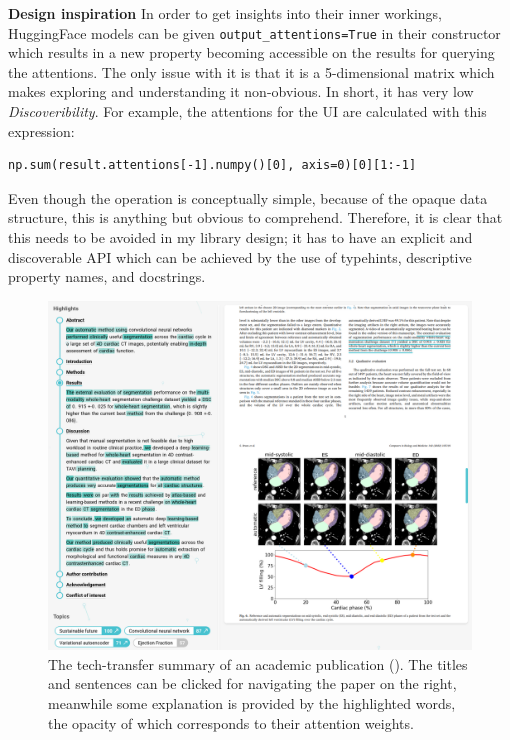 \begin{displayquote}
\textbf{Design inspiration} In order to get insights into their inner workings, HuggingFace models can be given \texttt{output\_attentions=True} in their constructor which results in a new property becoming accessible on the results for querying the attentions. The only issue with it is that it is a 5-dimensional matrix which makes exploring and understanding it non-obvious. In short, it has very low \textit{Discoveribility}. For example, the attentions for the UI are calculated with this expression:
\begin{verbatim}
np.sum(result.attentions[-1].numpy()[0], axis=0)[0][1:-1]
\end{verbatim}
Even though the operation is conceptually simple, because of the opaque data structure, this is anything but obvious to comprehend. Therefore, it is clear that this needs to be avoided in my library design; it has to have an explicit and discoverable API which can be achieved by the use of typehints, descriptive property names, and docstrings.
\end{displayquote}

\begin{figure}
    \centering
    \includegraphics[width=1\linewidth]{figures/dashboard-highlights.png}
    \captionsetup{width=.9\linewidth}
    \caption{The tech-transfer summary of an academic publication (\cite{bruns2022deep}). The titles and sentences can be clicked for navigating the paper on the right, meanwhile some explanation is provided by the highlighted words, the opacity of which corresponds to their attention weights.}
    \label{fig:dashboard-highlights}
\end{figure}

